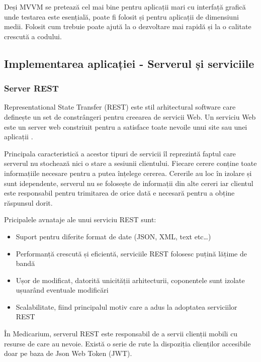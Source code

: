 \documentclass[12pt]{article}
\begin{document}
Deși MVVM se pretează cel mai bine pentru aplicații mari cu interfață grafică unde testarea este
esențială, poate fi folosit și pentru aplicații de dimensiuni medii. Folosit cum trebuie
poate ajută la o dezvoltare mai rapidă și la o calitate crescută a codului.

\subsection{Implementarea aplicației - Serverul și serviciile}

\subsubsection{Server REST}

Representational State Transfer (REST) este stil arhitectural software care definește
un set de constrângeri pentru creearea de servicii Web. Un serviciu Web este un server web
constriuit pentru a satisface toate nevoile unui site sau unei aplicații \cite{masse2011rest}.

Principala caracteristică a acestor tipuri de servicii îl reprezintă faptul care serverul
nu stochează nici o stare a sesiunii clientului. Fiecare cerere conține toate informațiile
necesare pentru a putea înțelege cererea. Cererile au loc în izolare și sunt idependente, serverul
nu se folosește de informații din alte cereri iar clientul este responsabil pentru trimitarea de
orice dată e necesară pentru a obține răspunsul dorit.

Pricipalele avnataje ale unui serviciu REST sunt:

\begin{itemize}
    \item Suport pentru diferite format de date (JSON, XML, text etc\dots)
    \item Performanță crescută și eficientă, serviciile REST folosesc puțină lățime de bandă
    \item Ușor de modificat, datorită unicității arhitecturii, coponentele sunt izolate
    ușuarând eventuale modificări
    \item Scalabilitate, fiind principalul motiv care a adus la adoptatea serviciilor REST \cite{masse2011rest}
\end{itemize}

În Medicarium, serverul REST este responsabil de a servii clienții mobili cu resurse de
care au nevoie. Există o serie de rute la dispoziția clienților accesibile doar pe baza 
de Json Web Token (JWT). 
\end{document}
